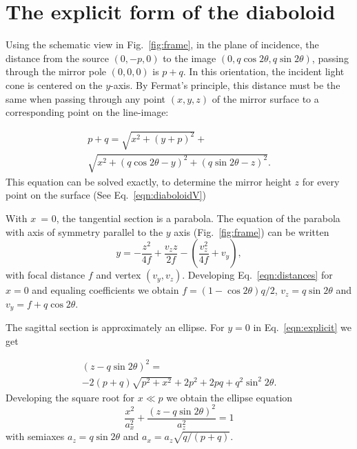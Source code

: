 \documentclass{iucr}       %
\begin{document}
\appendix

\section{The explicit form of the diaboloid }
\label{appendix:diaboloid}

Using the schematic view in Fig.~\ref{fig:frame}, in the plane of incidence, the distance from the source $(0,-p,0)$ to the image $(0,q \cos2\theta, q \sin2\theta)$, passing through the mirror pole $(0,0,0)$ is $p+q$. In this orientation, the incident light cone is centered on the $y$-axis. By Fermat's principle, this distance must be the same when passing through any point $(x,y,z)$ of the mirror surface to a corresponding point on the line-image:

\begin{multline}
\label{eqn:distances}
p + q = 
\sqrt{x^2 + (y + p)^2} + \\
\sqrt{x^2 + (q \cos2 \theta - y)^2 + (q \sin2 \theta - z)^2}.
\end{multline}
This equation can be solved exactly, to determine the mirror height $z$ for every point on the surface (See Eq.~\ref{eqn:diaboloidV})

With $x$~= 0, the tangential section is a parabola. The equation of the parabola with axis of symmetry parallel to the $y$ axis (Fig.~\ref{fig:frame}) can be written 
\begin{equation}
y = -\frac{z^2}{4 f} + \frac{v_z z}{2 f} - \left(\frac{v_z^2}{4 f} + v_y\right),
\end{equation}
\noindent with focal distance $f$ and vertex $(v_y,v_z)$. Developing Eq.~\ref{eqn:distances} for $x=0$ and equaling coefficients we obtain $f=(1-\cos2\theta)q/2$, $v_z=q \sin2\theta$ and $v_y=f+q\cos2\theta$.

The sagittal section is approximately an ellipse. For $y=0$ in Eq.~\ref{eqn:explicit} we get

\begin{multline}
\label{eqn:ellipse}
(z - q \sin2\theta)^2 = \\
-2 (p + q) \sqrt{p^2 + x^2}+ 
2 p^2 +2 p q + q^2 \sin^2 2 \theta.
\end{multline}
Developing the square root for $x\ll p$ we obtain the ellipse equation
\begin{equation}
\label{eqn:ellipse}
\frac{x^2}{a_x^2} + \frac{(z-q \sin2\theta)^2}{a_z^2}=1
\end{equation}
with semiaxes $a_z=q \sin2\theta$ and $a_x=a_z\sqrt{q/(p+q)}$.
\end{document}
